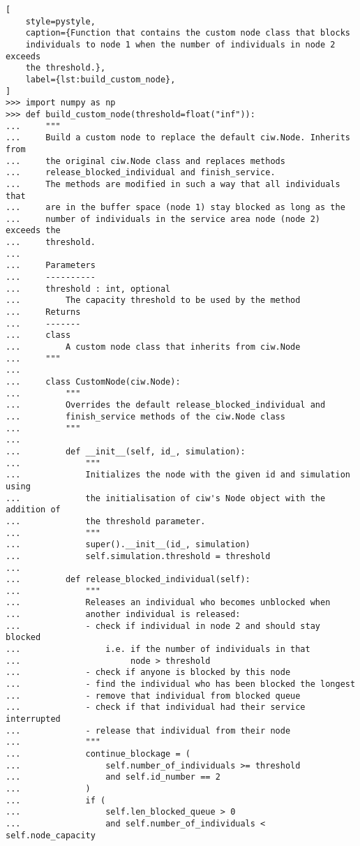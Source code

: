 \begin{lstlisting}[
    style=pystyle,
    caption={Function that contains the custom node class that blocks
    individuals to node 1 when the number of individuals in node 2 exceeds
    the threshold.},
    label={lst:build_custom_node},
]
>>> import numpy as np
>>> def build_custom_node(threshold=float("inf")):
...     """
...     Build a custom node to replace the default ciw.Node. Inherits from
...     the original ciw.Node class and replaces methods
...     release_blocked_individual and finish_service.
...     The methods are modified in such a way that all individuals that
...     are in the buffer space (node 1) stay blocked as long as the
...     number of individuals in the service area node (node 2) exceeds the
...     threshold.
...
...     Parameters
...     ----------
...     threshold : int, optional
...         The capacity threshold to be used by the method
...     Returns
...     -------
...     class
...         A custom node class that inherits from ciw.Node
...     """
...
...     class CustomNode(ciw.Node):
...         """
...         Overrides the default release_blocked_individual and
...         finish_service methods of the ciw.Node class
...         """
...
...         def __init__(self, id_, simulation):
...             """
...             Initializes the node with the given id and simulation using
...             the initialisation of ciw's Node object with the addition of
...             the threshold parameter.
...             """
...             super().__init__(id_, simulation)
...             self.simulation.threshold = threshold
...
...         def release_blocked_individual(self):
...             """
...             Releases an individual who becomes unblocked when
...             another individual is released:
...             - check if individual in node 2 and should stay blocked
...                 i.e. if the number of individuals in that
...                      node > threshold
...             - check if anyone is blocked by this node
...             - find the individual who has been blocked the longest
...             - remove that individual from blocked queue
...             - check if that individual had their service interrupted
...             - release that individual from their node
...             """
...             continue_blockage = (
...                 self.number_of_individuals >= threshold
...                 and self.id_number == 2
...             )
...             if (
...                 self.len_blocked_queue > 0
...                 and self.number_of_individuals < self.node_capacity

\end{lstlisting}
